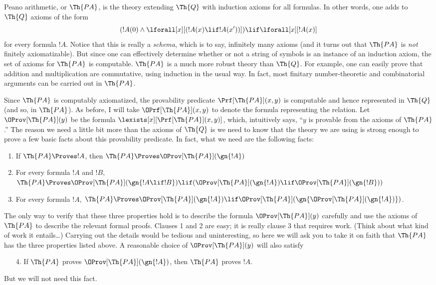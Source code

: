 \documentclass[../../../include/open-logic-section]{subfiles}
\begin{document}


Peano arithmetic, or $\Th{PA}$, is the theory extending $\Th{Q}$ with
induction axioms for all formulas. In other words, one adds to $\Th{Q}$
axioms of the form
\[
(!A(0) \land \lforall[x][(!A(x) \lif !A(x'))]) \lif \lforall[x][!A(x)]
\]
for every formula $!A$. Notice that this is really a {\em schema},
which is to say, infinitely many axioms (and it turns out that
$\Th{PA}$ is {\em not} finitely axiomatizable). But since one can
effectively determine whether or not a string of symbols is an
instance of an induction axiom, the set of axioms for $\Th{PA}$ is
computable. $\Th{PA}$ is a much more robust theory than $\Th{Q}$. For
example, one can easily prove that addition and multiplication are
commutative, using induction in the usual way. In fact, most finitary
number-theoretic and combinatorial arguments can be carried out in
$\Th{PA}$.

Since $\Th{PA}$ is computably axiomatized, the provability predicate
$\Prf[\Th{PA}](x,y)$ is computable and hence represented in $\Th{Q}$ (and
so, in $\Th{PA}$). As before, I will take $\OPrf[\Th{PA}](x,y)$ to denote
the formula representing the relation.  Let $\OProv[\Th{PA}](y)$ be the
formula $\lexists[x][\Prf[\Th{PA}](x,y)]$, which, intuitively says, ``$y$ is
provable from the axioms of $\Th{PA}$.''  The reason we need a little
bit more than the axioms of $\Th{Q}$ is we need to know that the
theory we are using is strong enough to prove a few basic facts about
this provability predicate. In fact, what we need are the following
facts:
\begin{enumerate}
\item If $\Th{PA} \Proves !A$, then $\Th{PA} \Proves
  \OProv[\Th{PA}](\gn{!A})$
\item For every formula $!A$ and $!B$, $\Th{PA} \Proves
  \OProv[\Th{PA}](\gn{!A \lif !B}) \lif (\OProv[\Th{PA}](\gn{!A}) \lif
  \OProv[\Th{PA}](\gn{!B}))$
\item For every formula $!A$, $\Th{PA} \Proves \OProv[\Th{PA}](\gn{!A})
\lif \OProv[\Th{PA}](\gn{\OProv[\Th{PA}](\gn{!A})})$.
\end{enumerate}
The only way to verify that these three properties hold is to describe
the formula $\OProv[\Th{PA}](y)$ carefully and use the axioms of $\Th{PA}$ to
describe the relevant formal proofs. Clauses 1 and 2 are easy; it is
really clause 3 that requires work. (Think about what kind of work it
entails\dots) Carrying out the details would be tedious and
uninteresting, so here we will ask you to take it on faith that
$\Th{PA}$ has the three properties listed above. A reasonable choice
of $\OProv[\Th{PA}](y)$ will also satisfy
\begin{enumerate}
\item[4.] If $\Th{PA}$ proves $\OProv[\Th{PA}](\gn{!A})$, then $\Th{PA}$ proves
  $!A$.
\end{enumerate}
But we will not need this fact.
\end{document}
